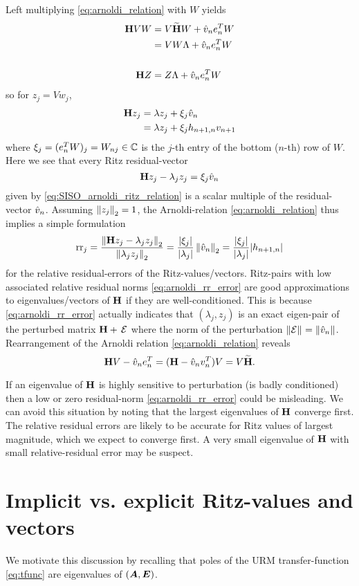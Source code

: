  Left multiplying \eqref{eq:arnoldi_relation} with $W$  yields
\begin{align}
\H V W &= V\Himp W + \vh_n e_n^{T} W \nonumber\\
	&= V W \Lambda + \vh_n e_n^{T} W \nonumber\\
\\
\H Z	&= Z \Lambda + \vh_n e_n^{T} W \label{eq:SISO_arnoldi_ritz_relation}
\end{align}
  so for $z_j = Vw_j$,
\[
\begin{aligned}
\H z_j &=  \lambda z_j +  \xi_j \vh_n \\ 
	  &=  \lambda z_j +  \xi_j h_{n+1,n} v_{n+1} 
\end{aligned}
\]
where $\xi_j = (e_n^T W)_j=W_{nj}\in\C$ is the $j$-th entry of the bottom ($n$-th) row of $W$.  Here we see that every Ritz residual-vector
\[
\H z_j - \lambda_j z_j = \xi_j \vh_n
\]
given by \eqref{eq:SISO_arnoldi_ritz_relation}   is a scalar multiple of the residual-vector $\vh_n$.  Assuming $\nrm{2}{z_j}=1$, the Arnoldi-relation \eqref{eq:arnoldi_relation} thus implies a simple formulation
\begin{equation}
\text{rr}_j = \frac{\nrm{2}{\H z_j - \lambda_j z_j}}{\nrm{2}{\lambda_j z_j}} 
= \frac{|\xi_j|}{|\lambda_j|} \nrm{2}{ \vh_n} 
= \frac{|\xi_j|}{|\lambda_j|}  |h_{n+1,n}|
\label{eq:arnoldi_rr_error} 
\end{equation}
 for the relative residual-errors of the Ritz-values/vectors.   Ritz-pairs with low associated relative residual norms \eqref{eq:arnoldi_rr_error} are good approximations to eigenvalues/vectors of $\H$ if they are well-conditioned.  This is because \eqref{eq:arnoldi_rr_error} actually indicates that $(\lambda_j,z_j)$ is an exact eigen-pair of the perturbed matrix $\H +\, \mathcal{E}$ where the norm of the perturbation $\nrm{}{\mathcal{E}} = \nrm{}{\vh_n}$. Rearrangement of the Arnoldi relation \eqref{eq:arnoldi_relation} reveals  
\[
\H V  - \vh_n e_n^{T} = (\H   - \vh_n v_n^{T}) V = V\Himp. 
\]

  If an eigenvalue of $\H$ is highly sensitive to perturbation (is badly conditioned) then a low or zero residual-norm    \eqref{eq:arnoldi_rr_error} could be misleading.  We can avoid this situation by noting that the largest eigenvalues of $\H$ converge first.   The relative residual errors are likely to be accurate for Ritz values of largest magnitude, which we expect to converge first.   A very small eigenvalue of $\H$ with small relative-residual error may be suspect.


\section{Implicit vs. explicit Ritz-values and vectors}
We motivate this discussion by recalling that poles of the URM transfer-function \eqref{eq:tfunc} are eigenvalues of $(\A,\E)$. 
   

